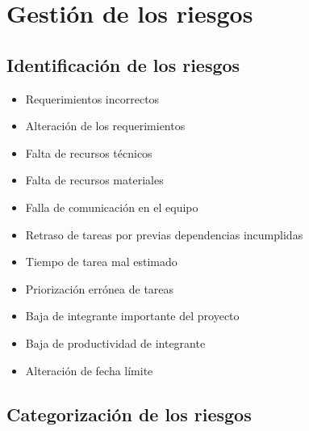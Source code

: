 \section{Gestión de los riesgos}

\subsection{Identificación de los riesgos}
\begin{itemize}
    \item Requerimientos incorrectos
    \item Alteración de los requerimientos
    \item Falta de recursos técnicos
    \item Falta de recursos materiales
    \item Falla de comunicación en el equipo
    \item Retraso de tareas por previas dependencias incumplidas
    \item Tiempo de tarea mal estimado
    \item Priorización errónea de tareas
    \item Baja de integrante importante del proyecto
    \item Baja de productividad de integrante
    \item Alteración de fecha límite
\end{itemize}
\newpage
\subsection{Categorización de los riesgos}


